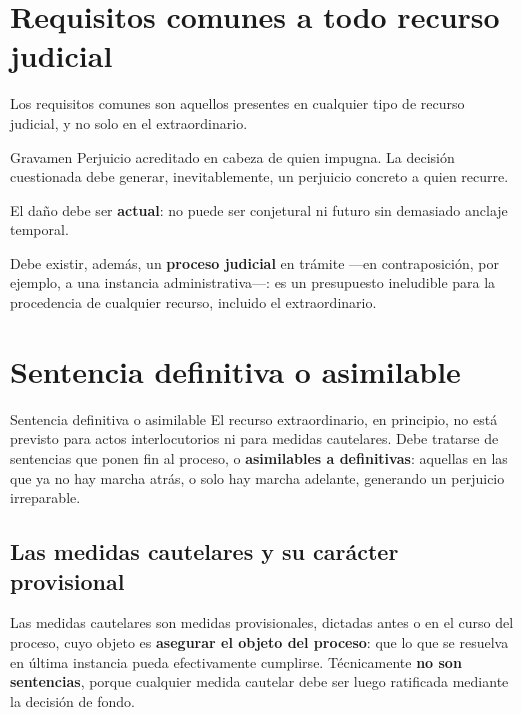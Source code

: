 \documentclass[12pt,oneside]{book}
\begin{document}
\section{Requisitos comunes a todo recurso judicial}

Los requisitos comunes son aquellos presentes en cualquier tipo de recurso judicial, y no solo en el extraordinario.

\begin{definition}{Gravamen}
Perjuicio acreditado en cabeza de quien impugna. La decisión cuestionada debe generar, inevitablemente, un perjuicio concreto a quien recurre.
\end{definition}

\begin{important}
El daño debe ser \textbf{actual}: no puede ser conjetural ni futuro sin demasiado anclaje temporal.
\end{important}

Debe existir, además, un \textbf{proceso judicial} en trámite ---en contraposición, por ejemplo, a una instancia administrativa---: es un presupuesto ineludible para la procedencia de cualquier recurso, incluido el extraordinario.

\section{Sentencia definitiva o asimilable}

\begin{definition}{Sentencia definitiva o asimilable}
El recurso extraordinario, en principio, no está previsto para actos interlocutorios ni para medidas cautelares. Debe tratarse de sentencias que ponen fin al proceso, o \textbf{asimilables a definitivas}: aquellas en las que ya no hay marcha atrás, o solo hay marcha adelante, generando un perjuicio irreparable.
\end{definition}

\subsection{Las medidas cautelares y su carácter provisional}

Las medidas cautelares son medidas provisionales, dictadas antes o en el curso del proceso, cuyo objeto es \textbf{asegurar el objeto del proceso}: que lo que se resuelva en última instancia pueda efectivamente cumplirse. Técnicamente \textbf{no son sentencias}, porque cualquier medida cautelar debe ser luego ratificada mediante la decisión de fondo.
\end{document}
